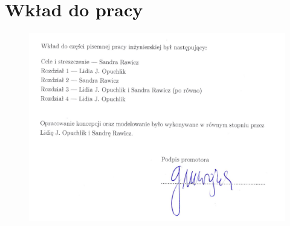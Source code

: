 \chapter*{Wkład do pracy}
\thispagestyle{empty}

\begin{figure}[H]
	\centering
	\includegraphics[width=1\linewidth]{images/podpis-wklad.pdf}
	\label{fig:wklad}
\end{figure}




%
%
%
%
%
%
%
%
